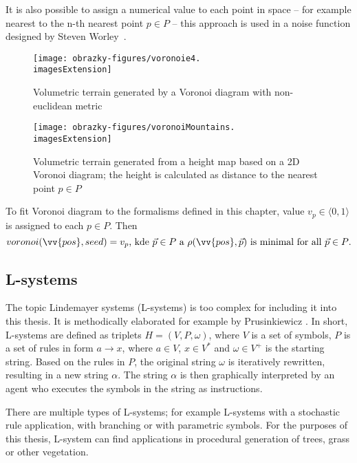 It is also possible to assign a numerical value to each point in space -- for example nearest to the n-th nearest point $p \in P$ -- this approach is used in a noise function designed by Steven Worley~\cite{Worley1996}.

\begin{figure}[H]
	\centering
	\begin{minipage}[t]{0.48\textwidth}
		\centering
		\texttt{[image: obrazky-figures/voronoie4.\\imagesExtension]}
		\caption[]{Volumetric terrain generated by a Voronoi diagram with non-euclidean metric}
		\label{e4MetricVoronoi}
	\end{minipage}
	\hfill
	\begin{minipage}[t]{0.48\textwidth}
		\centering
		\texttt{[image: obrazky-figures/voronoiMountains.\\imagesExtension]}
		\caption{Volumetric terrain generated from a height map based on a 2D Voronoi diagram; the height is calculated as distance to the nearest point $p \in P$}
		\label{mountainsVoronoi}
	\end{minipage}
\end{figure}

To fit Voronoi diagram to the formalisms defined in this chapter, value $v_p \in \langle0,1\rangle$ is assigned to each $p \in P$. Then
\begin{equation}
	voronoi(\vv{pos}, seed) = v_p \text{, kde $\vec{p} \in P$ a $\rho(\vv{pos}, \vec{p})$ is minimal for all $\vec{p} \in P$.}
\end{equation}

\subsection{L-systems}
The topic Lindemayer systems (L-systems) is too complex for including it into this thesis. It is methodically elaborated for example by Prusinkiewicz \cite{OstebeeArnold1997TABo}. In short, L-systems are defined as triplets $H = (V, P, \omega)$, where $V$ is a set of symbols, $P$ is a set of rules in form $a \rightarrow x$, where $a \in V$, $x \in V^*$ and $\omega \in V^+$ is the starting string. Based on the rules in $P$, the original string $\omega$ is iteratively rewritten, resulting in a new string $\alpha$. The string $\alpha$ is then graphically interpreted by an agent who executes the symbols in the string as instructions.

There are multiple types of L-systems; for example L-systems with a stochastic rule application, with branching or with parametric symbols. For the purposes of this thesis, L-system can find applications in procedural generation of trees, grass or other vegetation.

